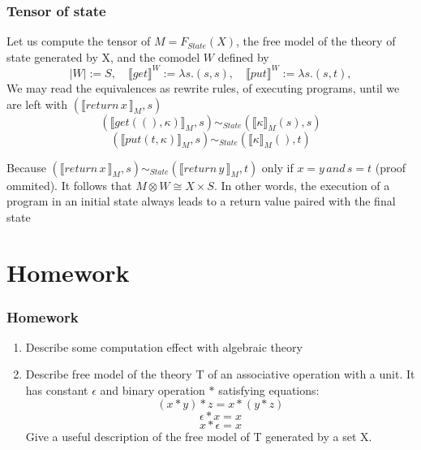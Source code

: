 \documentclass{beamer}
\begin{document}
\begin{frame}
    \frametitle{Tensor of state}
    Let us compute the tensor of $M = F_{State}(X)$, the free model of the theory of state generated by X, and the comodel 
    $W$  defined by 
    \[
      |W| := S, \quad \llbracket get \rrbracket^W := \lambda s. (s, s), \quad   \llbracket put \rrbracket^W := \lambda s. (s, t),
    \]
    We may read the equivalences as rewrite rules, of executing programs, until we are left with $(\llbracket return \, x \, \rrbracket_M, s)$
    \[
      (\llbracket get((), \kappa)\rrbracket_M , s) \sim_{State} ( \llbracket \kappa \rrbracket_M (s), s)
    \]
    \[ 
        (\llbracket put(t, \kappa)\rrbracket_M , s) \sim_{State} ( \llbracket \kappa \rrbracket_M (), t)  
    \]

   Because $(\llbracket return \, x \, \rrbracket_M, s) \sim_{State} 
   (\llbracket return \, y \, \rrbracket_M, t)$ only if $x = y \, and \, s = t$ (proof ommited). 
   It follows that $M \otimes W \cong X \times S$.  In other words, the execution of a program in an initial
   state always leads to a return value paired with the final state

    

\end{frame}



\section{Homework}
\begin{frame}
    \frametitle{Homework}
    \begin{enumerate}
        \item Describe some computation effect with algebraic theory
        \item Describe free model of the theory T of an associative operation with a unit.
            It has constant $\epsilon$ and binary operation $*$ satisfying equations:
            \[
                (x * y) * z = x * (y * z)
            \]
            \[
                \epsilon * x = x
            \]
            \[
              x * \epsilon = x   
            \]
            Give a useful description of the free model of T generated by a set X. 
        
    \end{enumerate}
    
    

\end{frame}
\end{document}
